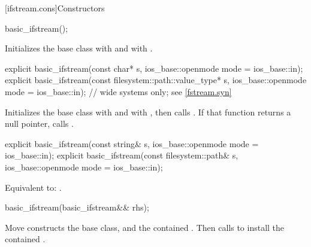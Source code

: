 [ifstream.cons]{Constructors}

%
\begin{itemdecl}
basic_ifstream();
\end{itemdecl}

\begin{itemdescr}
\pnum
\effects
Initializes the base class with
and  with
.
\end{itemdescr}

%
\begin{itemdecl}
explicit basic_ifstream(const char* s,
                        ios_base::openmode mode = ios_base::in);
explicit basic_ifstream(const filesystem::path::value_type* s,
                        ios_base::openmode mode = ios_base::in);  // wide systems only; see \ref{fstream.syn}
\end{itemdecl}

\begin{itemdescr}
\pnum
\effects
Initializes the base class with
and  with
,
then calls
.
If that function returns a null pointer, calls
.
\end{itemdescr}

%
\begin{itemdecl}
explicit basic_ifstream(const string& s,
                        ios_base::openmode mode = ios_base::in);
explicit basic_ifstream(const filesystem::path& s,
                        ios_base::openmode mode = ios_base::in);
\end{itemdecl}

\begin{itemdescr}
\pnum
\effects
Equivalent to: .
\end{itemdescr}

%
\begin{itemdecl}
basic_ifstream(basic_ifstream&& rhs);
\end{itemdecl}

\begin{itemdescr}
\pnum
\effects
Move constructs the base class, and the contained .
Then calls 
to install the contained .
\end{itemdescr}

